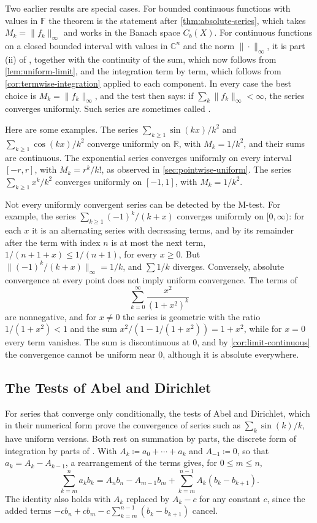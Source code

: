 Two earlier results are special cases. For bounded continuous functions with values in $\mathbb F$ the theorem is the statement after \cref{thm:absolute-series}, which takes $M_k=\|f_k\|_\infty$ and works in the Banach space $C_b(X)$. For continuous functions on a closed bounded interval with values in $\mathbb C^n$ and the norm $\|\cdot\|_\infty$, it is part (ii) of , together with the continuity of the sum, which now follows from \cref{lem:uniform-limit}, and the integration term by term, which follows from \cref{cor:termwise-integration} applied to each component. In every case the best choice is $M_k=\|f_k\|_\infty$, and the test then says: if $\sum_k\|f_k\|_\infty<\infty$, the series converges uniformly. Such series are sometimes called .

Here are some examples. The series $\sum_{k\ge1}\sin(kx)/k^2$ and $\sum_{k\ge1}\cos(kx)/k^2$ converge uniformly on $\mathbb R$, with $M_k=1/k^2$, and their sums are continuous. The exponential series converges uniformly on every interval $[-r,r]$, with $M_k=r^k/k!$, as observed in \cref{sec:pointwise-uniform}. The series $\sum_{k\ge1}x^k/k^2$ converges uniformly on $[-1,1]$, with $M_k=1/k^2$.

Not every uniformly convergent series can be detected by the M-test. For example, the series $\sum_{k\ge1}(-1)^k/(k+x)$ converges uniformly on $[0,\infty)$: for each $x$ it is an alternating series with decreasing terms, and by  its remainder after the term with index $n$ is at most the next term, $1/(n+1+x)\le1/(n+1)$, for every $x\ge0$. But $\|(-1)^k/(k+x)\|_\infty=1/k$, and $\sum1/k$ diverges. Conversely, absolute convergence at every point does not imply uniform convergence. The terms of
\[
\sum_{k=0}^\infty\frac{x^2}{(1+x^2)^k}
\]
are nonnegative, and for $x\ne0$ the series is geometric with the ratio $1/(1+x^2)<1$ and the sum $x^2/(1-1/(1+x^2))=1+x^2$, while for $x=0$ every term vanishes. The sum is discontinuous at $0$, and by \cref{cor:limit-continuous} the convergence cannot be uniform near $0$, although it is absolute everywhere.

\subsection{The Tests of Abel and Dirichlet}

For series that converge only conditionally, the tests of Abel and Dirichlet, which in their numerical form prove the convergence of series such as $\sum_k\sin(k)/k$, have uniform versions. Both rest on summation by parts, the discrete form of integration by parts of . With $A_k\coloneqq a_0+\cdots+a_k$ and $A_{-1}\coloneqq0$, so that $a_k=A_k-A_{k-1}$, a rearrangement of the terms gives, for $0\le m\le n$,
\begin{equation}
\sum_{k=m}^na_kb_k=A_nb_n-A_{m-1}b_m+\sum_{k=m}^{n-1}A_k(b_k-b_{k+1}) .
\label{eq:summation-by-parts}
\end{equation}
The identity also holds with $A_k$ replaced by $A_k-c$ for any constant $c$, since the added terms $-cb_n+cb_m-c\sum_{k=m}^{n-1}(b_k-b_{k+1})$ cancel.

